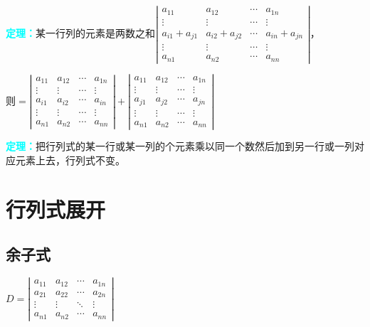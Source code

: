 \documentclass[UTF8, 12pt]{ctexart}
\begin{document}
\textcolor{aqua}{\textbf{定理：}}某一行列的元素是两数之和$
\left|\begin{array}{cccc} 
    a_{11} & a_{12} & \cdots & a_{1n} \\
    \vdots & \vdots & \cdots & \vdots \\
    a_{i1}+a_{j1} & a_{i2}+a_{j2} & \cdots & a_{in}+a_{jn} \\
    \vdots & \vdots & \cdots & \vdots \\
    a_{n1} & a_{n2} & \cdots & a_{nn}
\end{array}\right| 
$，

则$=\left|\begin{array}{cccc} 
    a_{11} & a_{12} & \cdots & a_{1n} \\
    \vdots & \vdots & \cdots & \vdots \\
    a_{i1} & a_{i2} & \cdots & a_{in}\\
    \vdots & \vdots & \cdots & \vdots \\
    a_{n1} & a_{n2} & \cdots & a_{nn}
\end{array}\right|+
\left|\begin{array}{cccc} 
    a_{11} & a_{12} & \cdots & a_{1n} \\
    \vdots & \vdots & \cdots & \vdots \\
    a_{j1} & a_{j2} & \cdots & a_{jn} \\
    \vdots & \vdots & \cdots & \vdots \\
    a_{n1} & a_{n2} & \cdots & a_{nn}
\end{array}\right|$

\textcolor{aqua}{\textbf{定理：}}把行列式的某一行或某一列的个元素乘以同一个数然后加到另一行或一列对应元素上去，行列式不变。

\section{行列式展开}

\subsection{余子式}

$
D=\left|\begin{array}{cccc} 
    a_{11} & a_{12} & \cdots & a_{1n} \\
    a_{21} & a_{22} & \cdots & a_{2n} \\
    \vdots & \vdots & \ddots & \vdots \\
    a_{n1} & a_{n2} & \cdots & a_{nn}
\end{array}\right|
$
\end{document}
